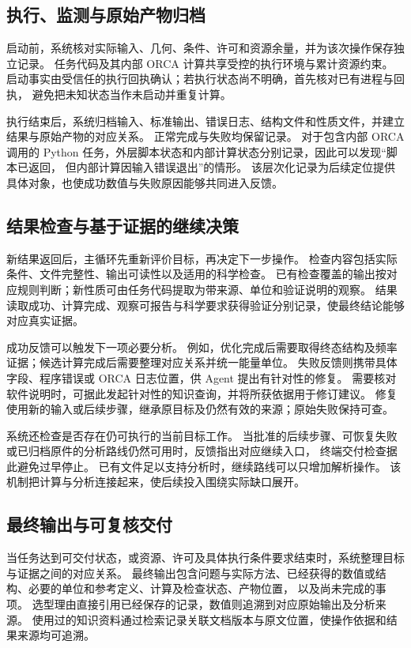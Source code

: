 \documentclass[UTF8,fontset=fandol,a4paper,11pt]{ctexart}
\begin{document}
\subsection{执行、监测与原始产物归档}
启动前，系统核对实际输入、几何、条件、许可和资源余量，并为该次操作保存独立记录。%
任务代码及其内部 ORCA 计算共享受控的执行环境与累计资源约束。%
启动事实由受信任的执行回执确认；若执行状态尚不明确，首先核对已有进程与回执，%
避免把未知状态当作未启动并重复计算。

执行结束后，系统归档输入、标准输出、错误日志、结构文件和性质文件，并建立结果与原始产物的对应关系。%
正常完成与失败均保留记录。%
对于包含内部 ORCA 调用的 Python 任务，外层脚本状态和内部计算状态分别记录，因此可以发现“脚本已返回，%
但内部计算因输入错误退出”的情形。%
该层次化记录为后续定位提供具体对象，也使成功数值与失败原因能够共同进入反馈。

\subsection{结果检查与基于证据的继续决策}
新结果返回后，主循环先重新评价目标，再决定下一步操作。%
检查内容包括实际条件、文件完整性、输出可读性以及适用的科学检查。%
已有检查覆盖的输出按对应规则判断；新性质可由任务代码提取为带来源、单位和验证说明的观察。%
结果读取成功、计算完成、观察可报告与科学要求获得验证分别记录，使最终结论能够对应真实证据。

成功反馈可以触发下一项必要分析。%
例如，优化完成后需要取得终态结构及频率证据；候选计算完成后需要整理对应关系并统一能量单位。%
失败反馈则携带具体字段、程序错误或 ORCA 日志位置，供 Agent 提出有针对性的修复。%
需要核对软件说明时，可据此发起针对性的知识查询，并将所获依据用于修订建议。%
修复使用新的输入或后续步骤，继承原目标及仍然有效的来源；原始失败保持可查。

系统还检查是否存在仍可执行的当前目标工作。%
当批准的后续步骤、可恢复失败或已归档原件的分析路线仍然可用时，反馈指出对应继续入口，%
终端交付检查据此避免过早停止。%
已有文件足以支持分析时，继续路线可以只增加解析操作。%
该机制把计算与分析连接起来，使后续投入围绕实际缺口展开。

\subsection{最终输出与可复核交付}
当任务达到可交付状态，或资源、许可及具体执行条件要求结束时，系统整理目标与证据之间的对应关系。%
最终输出包含问题与实际方法、已经获得的数值或结构、必要的单位和参考定义、计算及检查状态、产物位置，%
以及尚未完成的事项。%
选型理由直接引用已经保存的记录，数值则追溯到对应原始输出及分析来源。
使用过的知识资料通过检索记录关联文档版本与原文位置，使操作依据和结果来源均可追溯。%
\end{document}
